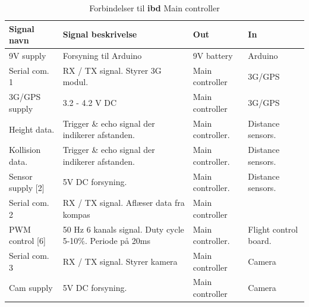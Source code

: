 \begin{table}[H]
	\centering
		\begin{tabular}{|p{2.6 cm}|p{4.9 cm}|p{2.5 cm}|p{2.5 cm}|}  
		\hline
			\textbf{Signal navn} 	& \textbf{Signal beskrivelse}		& \textbf{Out} 				& \textbf{In}     \\ \hline
			9V supply & Forsyning til Arduino & 9V battery & Arduino 		    \\ \hline
			Serial com. 1		& RX / TX signal. Styrer 3G modul. 	& Main controller 	& 3G/GPS    \\ \hline
			3G/GPS supply 		& 3.2 - 4.2 V DC						& Main controller	& 3G/GPS	\\ \hline
			Height data.		& Trigger \& echo signal der indikerer afstanden. 	& Main controller.	& Distance sensors.	\\ \hline
			Kollision data.		& Trigger \& echo signal der indikerer afstanden. 	& Main controller.	& Distance sensors.  \\ \hline
			Sensor supply [2]	& 5V DC forsyning.	& Main controller. & Distance sensors.	\\ \hline
			Serial com. 2		& RX / TX signal. Aflæser data fra kompas & Main controller				& 	\\ \hline 
			PWM control [6]		& 50 Hz 6 kanals signal. Duty cycle 5-10\%. Periode på 20ms	& Main controller.				& Flight control board.	\\ \hline
			Serial com. 3		& RX / TX signal. Styrer kamera	& Main controller	& Camera	\\ \hline
			Cam supply			& 5V DC forsyning. 	& Main controller	& Camera	\\ \hline 
		\end{tabular}
	\caption{Forbindelser til \textbf{ibd} Main controller}
	\label{tab:IBDMaincontroller}
\end{table}

